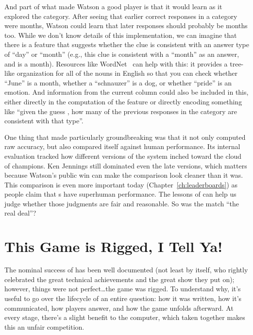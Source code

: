 And part of what made Watson a good \jeopardy{} player is that it would learn
as it explored the category.
%
After seeing that earlier correct responses in a category were months,
Watson could learn that later responses should probably be months too.
%
While we don't know details of this implementation, we can
imagine that there is a feature that suggests whether the clue is consistent
with an answer type of ``day'' or ``month'' (e.g., this clue is consistent
with a ``month'' as an answer, and  is a month).
%
Resources like WordNet~\citep{miller-90} can help with this: it
provides a tree-like organization for all of the nouns in English so
that you can check whether ``June'' is a month, whether a
``schnauzer'' is a dog, or whether ``pride'' is an emotion.
%
And information from the current column could also be included in this, either
directly in the computation of the feature or directly encoding something like
``given the guess , how many of the previous responses in the
category are consistent with that type''.

One thing that made \watson{} particularly groundbreaking was that it not only
computed raw accuracy, but also compared itself against human performance.
%
Its internal evaluation tracked how different versions of the system
inched toward the cloud of \jeopardy{} champions.
%
Ken Jennings still dominated even the late versions, which matters
because Watson's public win can make the comparison look cleaner than
it was.
%
This comparison is even more important today (Chapter~\ref{ch:leaderboards})
as people claim that s have superhuman performance.
%
The lessons of \watson{} can help us judge whether those judgments are
fair and reasonable.
%
So was the \watson{} match ``the real deal''?

\section{This Game is Rigged, I Tell Ya!}

The nominal success of \watson{} has been well documented (not least by 
itself, who rightly celebrated the great technical achievements and the great
show they put on); however,
things were not perfect\dots the game was rigged.
%
To understand why, it's useful to go over the lifecycle of an entire question: how it was
written, how it's communicated, how players answer, and how the game
unfolds afterward.
%
At every stage, there's a slight benefit to the computer, which taken
together makes this an unfair competition.

